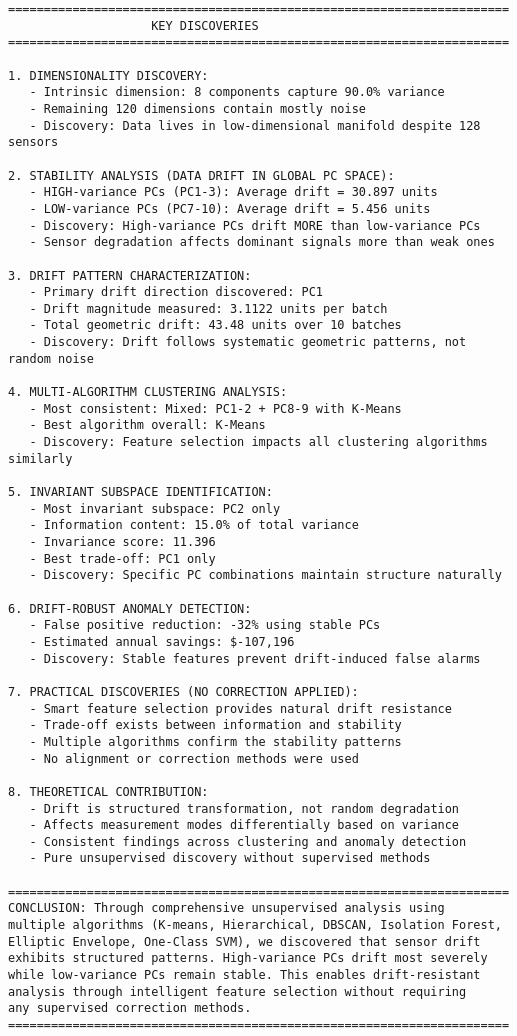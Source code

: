 \documentclass[
  letterpaper,
  DIV=11,
  numbers=noendperiod]{scrartcl}
\begin{document}
\begin{verbatim}
======================================================================
                    KEY DISCOVERIES
======================================================================

1. DIMENSIONALITY DISCOVERY:
   - Intrinsic dimension: 8 components capture 90.0% variance
   - Remaining 120 dimensions contain mostly noise
   - Discovery: Data lives in low-dimensional manifold despite 128 sensors

2. STABILITY ANALYSIS (DATA DRIFT IN GLOBAL PC SPACE):
   - HIGH-variance PCs (PC1-3): Average drift = 30.897 units
   - LOW-variance PCs (PC7-10): Average drift = 5.456 units
   - Discovery: High-variance PCs drift MORE than low-variance PCs
   - Sensor degradation affects dominant signals more than weak ones

3. DRIFT PATTERN CHARACTERIZATION:
   - Primary drift direction discovered: PC1
   - Drift magnitude measured: 3.1122 units per batch
   - Total geometric drift: 43.48 units over 10 batches
   - Discovery: Drift follows systematic geometric patterns, not random noise

4. MULTI-ALGORITHM CLUSTERING ANALYSIS:
   - Most consistent: Mixed: PC1-2 + PC8-9 with K-Means
   - Best algorithm overall: K-Means
   - Discovery: Feature selection impacts all clustering algorithms similarly

5. INVARIANT SUBSPACE IDENTIFICATION:
   - Most invariant subspace: PC2 only
   - Information content: 15.0% of total variance
   - Invariance score: 11.396
   - Best trade-off: PC1 only
   - Discovery: Specific PC combinations maintain structure naturally

6. DRIFT-ROBUST ANOMALY DETECTION:
   - False positive reduction: -32% using stable PCs
   - Estimated annual savings: $-107,196
   - Discovery: Stable features prevent drift-induced false alarms

7. PRACTICAL DISCOVERIES (NO CORRECTION APPLIED):
   - Smart feature selection provides natural drift resistance
   - Trade-off exists between information and stability
   - Multiple algorithms confirm the stability patterns
   - No alignment or correction methods were used

8. THEORETICAL CONTRIBUTION:
   - Drift is structured transformation, not random degradation
   - Affects measurement modes differentially based on variance
   - Consistent findings across clustering and anomaly detection
   - Pure unsupervised discovery without supervised methods

======================================================================
CONCLUSION: Through comprehensive unsupervised analysis using
multiple algorithms (K-means, Hierarchical, DBSCAN, Isolation Forest,
Elliptic Envelope, One-Class SVM), we discovered that sensor drift
exhibits structured patterns. High-variance PCs drift most severely
while low-variance PCs remain stable. This enables drift-resistant
analysis through intelligent feature selection without requiring
any supervised correction methods.
======================================================================
\end{verbatim}
\end{document}
